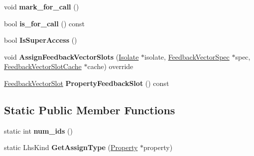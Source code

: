 \begin{DoxyCompactItemize}
\item 
void {\bfseries mark\+\_\+for\+\_\+call} ()\hypertarget{classv8_1_1internal_1_1_property_a2da7bb11bace57899cae4403ce35a936}{}\label{classv8_1_1internal_1_1_property_a2da7bb11bace57899cae4403ce35a936}

\item 
bool {\bfseries is\+\_\+for\+\_\+call} () const \hypertarget{classv8_1_1internal_1_1_property_aca9a0b0554cb35f4a4e146d89ba68bef}{}\label{classv8_1_1internal_1_1_property_aca9a0b0554cb35f4a4e146d89ba68bef}

\item 
bool {\bfseries Is\+Super\+Access} ()\hypertarget{classv8_1_1internal_1_1_property_a6843df847d166de1422424b8a38fb3cf}{}\label{classv8_1_1internal_1_1_property_a6843df847d166de1422424b8a38fb3cf}

\item 
void {\bfseries Assign\+Feedback\+Vector\+Slots} (\hyperlink{classv8_1_1internal_1_1_isolate}{Isolate} $\ast$isolate, \hyperlink{classv8_1_1internal_1_1_feedback_vector_spec}{Feedback\+Vector\+Spec} $\ast$spec, \hyperlink{classv8_1_1internal_1_1_feedback_vector_slot_cache}{Feedback\+Vector\+Slot\+Cache} $\ast$cache) override\hypertarget{classv8_1_1internal_1_1_property_a27d479957701a9ecec88a3674c51baf1}{}\label{classv8_1_1internal_1_1_property_a27d479957701a9ecec88a3674c51baf1}

\item 
\hyperlink{classv8_1_1internal_1_1_feedback_vector_slot}{Feedback\+Vector\+Slot} {\bfseries Property\+Feedback\+Slot} () const \hypertarget{classv8_1_1internal_1_1_property_a750c44d94c9db0111d9980e167e1bb5d}{}\label{classv8_1_1internal_1_1_property_a750c44d94c9db0111d9980e167e1bb5d}

\end{DoxyCompactItemize}
\subsection*{Static Public Member Functions}
\begin{DoxyCompactItemize}
\item 
static int {\bfseries num\+\_\+ids} ()\hypertarget{classv8_1_1internal_1_1_property_a49859fbcccaedcab3c241b85cc51e0f1}{}\label{classv8_1_1internal_1_1_property_a49859fbcccaedcab3c241b85cc51e0f1}

\item 
static Lhs\+Kind {\bfseries Get\+Assign\+Type} (\hyperlink{classv8_1_1internal_1_1_property}{Property} $\ast$property)\hypertarget{classv8_1_1internal_1_1_property_a486a48791aa86bd221434941785de724}{}\label{classv8_1_1internal_1_1_property_a486a48791aa86bd221434941785de724}

\end{DoxyCompactItemize}
